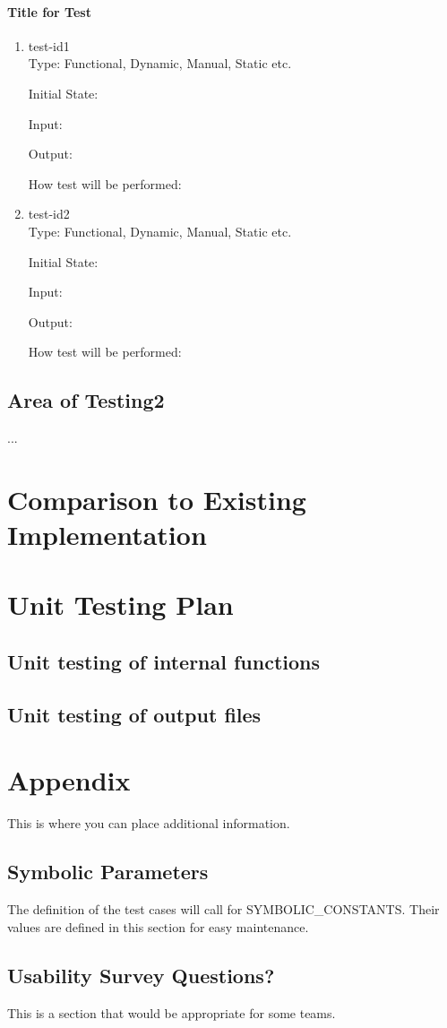 \documentclass[12pt, titlepage]{article}
\begin{document}
\paragraph{Title for Test}
\begin{enumerate}
\item{test-id1\\}
Type: Functional, Dynamic, Manual, Static etc.
					
Initial State: 
					
Input: 
					
Output: 
					
How test will be performed: 
					
\item{test-id2\\}
Type: Functional, Dynamic, Manual, Static etc.
					
Initial State: 
					
Input: 
					
Output: 
					
How test will be performed: 
\end{enumerate}
\subsection{Area of Testing2}
...
	
\section{Comparison to Existing Implementation}	
				
\section{Unit Testing Plan}
		
\subsection{Unit testing of internal functions}
		
\subsection{Unit testing of output files}		


\newpage
\section{Appendix}
This is where you can place additional information.
\subsection{Symbolic Parameters}
The definition of the test cases will call for SYMBOLIC\_CONSTANTS.
Their values are defined in this section for easy maintenance.
\subsection{Usability Survey Questions?}
This is a section that would be appropriate for some teams.
\end{document}
